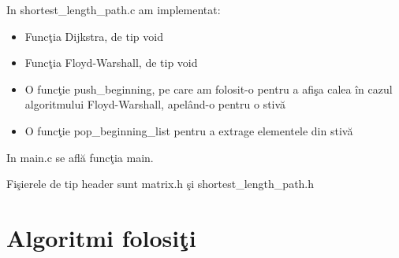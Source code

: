 \documentclass{article}
\begin{document}
In shortest\_length\_path.c am implementat:
\begin{itemize}
    \item Func\c{t}ia Dijkstra, de tip void
    \item Func\c{t}ia Floyd-Warshall, de tip void
    \item O func\c{t}ie push\_beginning, pe care am folosit-o pentru a afi\c{s}a calea \^{i}n cazul algoritmului Floyd-Warshall, apel\^{a}nd-o pentru o stiv\u{a}
    \item O func\c{t}ie pop\_beginning\_list pentru a extrage elementele din stiv\u{a}
\end{itemize}

In main.c se afl\u{a} func\c{t}ia main.

Fi\c{s}ierele de tip header sunt matrix.h \c{s}i shortest\_length\_path.h



\section{Algoritmi folosi\c{t}i}
\end{document}
